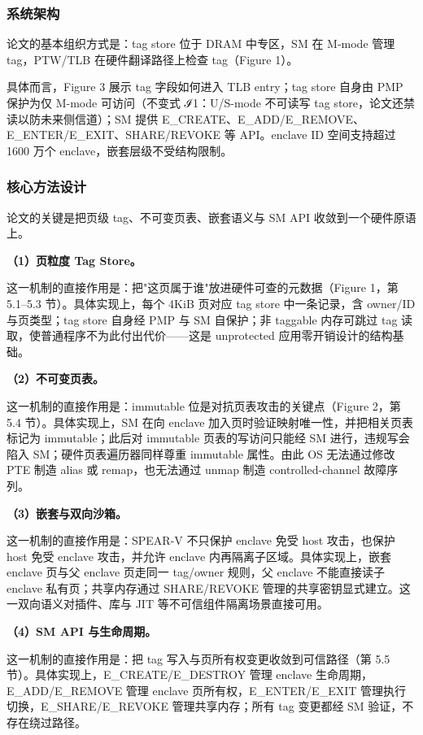 \documentclass[11pt]{ctexart}
\begin{document}
\subsubsection{系统架构}
论文的基本组织方式是：tag store 位于 DRAM 中专区，SM 在 M-mode 管理 tag，PTW/TLB 在硬件翻译路径上检查 tag（Figure 1）。\par
具体而言，Figure 3 展示 tag 字段如何进入 TLB entry；tag store 自身由 PMP 保护为仅 M-mode 可访问（不变式 ℐ1：U/S-mode 不可读写 tag store，论文还禁读以防未来侧信道）；SM 提供 E\_CREATE、E\_ADD/E\_REMOVE、E\_ENTER/E\_EXIT、SHARE/REVOKE 等 API。enclave ID 空间支持超过 1600 万个 enclave，嵌套层级不受结构限制。\par
\subsubsection{核心方法设计}
论文的关键是把页级 tag、不可变页表、嵌套语义与 SM API 收敛到一个硬件原语上。\par
\noindent\textbf{（1）页粒度 Tag Store。}\par
这一机制的直接作用是：把"这页属于谁"放进硬件可查的元数据（Figure 1，第 5.1--5.3 节）。具体实现上，每个 4KiB 页对应 tag store 中一条记录，含 owner/ID 与页类型；tag store 自身经 PMP 与 SM 自保护；非 taggable 内存可跳过 tag 读取，使普通程序不为此付出代价——这是 unprotected 应用零开销设计的结构基础。\par
\noindent\textbf{（2）不可变页表。}\par
这一机制的直接作用是：immutable 位是对抗页表攻击的关键点（Figure 2，第 5.4 节）。具体实现上，SM 在向 enclave 加入页时验证映射唯一性，并把相关页表标记为 immutable；此后对 immutable 页表的写访问只能经 SM 进行，违规写会陷入 SM；硬件页表遍历器同样尊重 immutable 属性。由此 OS 无法通过修改 PTE 制造 alias 或 remap，也无法通过 unmap 制造 controlled-channel 故障序列。\par
\noindent\textbf{（3）嵌套与双向沙箱。}\par
这一机制的直接作用是：SPEAR-V 不只保护 enclave 免受 host 攻击，也保护 host 免受 enclave 攻击，并允许 enclave 内再隔离子区域。具体实现上，嵌套 enclave 页与父 enclave 页走同一 tag/owner 规则，父 enclave 不能直接读子 enclave 私有页；共享内存通过 SHARE/REVOKE 管理的共享密钥显式建立。这一双向语义对插件、库与 JIT 等不可信组件隔离场景直接可用。\par
\noindent\textbf{（4）SM API 与生命周期。}\par
这一机制的直接作用是：把 tag 写入与页所有权变更收敛到可信路径（第 5.5 节）。具体实现上，E\_CREATE/E\_DESTROY 管理 enclave 生命周期，E\_ADD/E\_REMOVE 管理 enclave 页所有权，E\_ENTER/E\_EXIT 管理执行切换，E\_SHARE/E\_REVOKE 管理共享内存；所有 tag 变更都经 SM 验证，不存在绕过路径。\par
\end{document}
